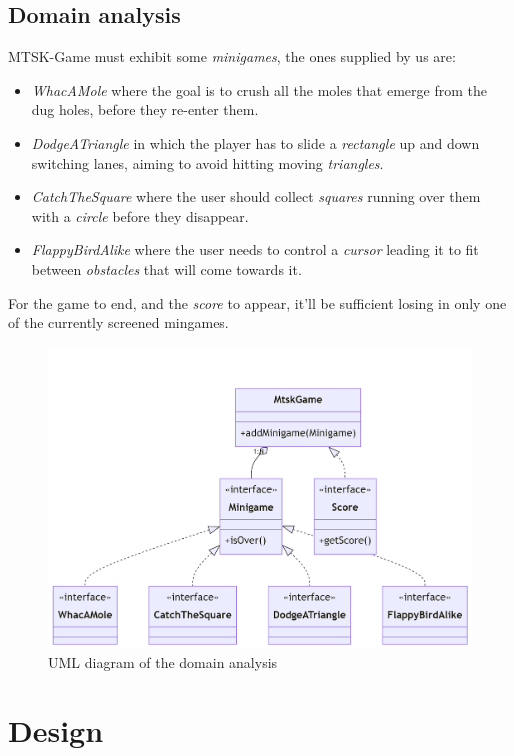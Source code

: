 \documentclass[a4paper,12pt]{report}
\begin{document}
\section{Domain analysis}

MTSK-Game must exhibit some \textit{minigames}, the ones supplied by us are:
\begin{itemize} 
	\item \textit{WhacAMole} where the goal is to crush all the moles that emerge from the dug holes, before they re-enter them.
	\item \textit{DodgeATriangle} in which the player has to slide a \textit{rectangle} up and down switching lanes, aiming to avoid hitting moving \textit{triangles}.
	\item \textit{CatchTheSquare} where the user should collect \textit{squares} running over them with a \textit{circle} before they disappear.
	\item \textit{FlappyBirdAlike} where the user needs to control a \textit{cursor} leading it to fit between \textit{obstacles} that will come towards it.
\end{itemize}
For the game to end, and the \textit{score} to appear, it'll be sufficient losing in only one of the currently screened mingames.


\begin{figure}[h]
	\centering{}
	\includegraphics[width=\textwidth]{res/mermaid-diagram-2022-12-24-032504.png}
	\caption{UML diagram of the domain analysis}
\end{figure}

\chapter{Design}
\end{document}

